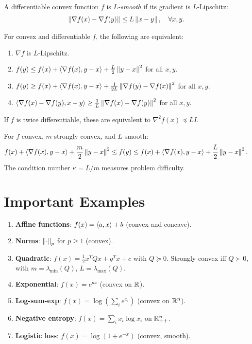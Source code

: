 \begin{definition}[$L$-Smoothness]
A differentiable convex function $f$ is \emph{$L$-smooth} if its gradient is
$L$-Lipschitz:
\[
    \left\| \nabla f(x) - \nabla f(y) \right\| \leq L\left\| x - y \right\|, \quad \forall x, y.
\]
\end{definition}

\begin{theorem}
\label{thm:smoothness}
For convex and differentiable $f$, the following are equivalent:
\begin{enumerate}
    \item $\nabla f$ is $L$-Lipschitz.
    \item $f(y) \leq f(x) + \langle \nabla f(x), y-x \rangle + \frac{L}{2}\left\| y-x \right\|^2$ for all $x, y$.
    \item $f(y) \geq f(x) + \langle \nabla f(x), y-x \rangle + \frac{1}{2L}\left\| \nabla f(y) - \nabla f(x) \right\|^2$ for all $x, y$.
    \item $\langle \nabla f(x) - \nabla f(y), x - y \rangle \geq \frac{1}{L}\left\| \nabla f(x) - \nabla f(y) \right\|^2$ for all $x, y$.
\end{enumerate}
If $f$ is twice differentiable, these are equivalent to $\nabla^2 f(x) \preceq LI$.
\end{theorem}

\begin{keyformulas}[title=\textbf{Fundamental Sandwich Bound}]
For $f$ convex, $m$-strongly convex, and $L$-smooth:
\[
    f(x) + \langle \nabla f(x), y-x \rangle + \frac{m}{2}\left\| y-x \right\|^2
    \leq f(y) \leq
    f(x) + \langle \nabla f(x), y-x \rangle + \frac{L}{2}\left\| y-x \right\|^2.
\]
The condition number $\kappa = L/m$ measures problem difficulty.
\end{keyformulas}

\section{Important Examples}

\begin{example}
\begin{enumerate}
    \item \textbf{Affine functions}: $f(x) = \langle a, x \rangle + b$ (convex and concave).
    \item \textbf{Norms}: $\left\| \cdot \right\|_p$ for $p \geq 1$ (convex).
    \item \textbf{Quadratic}: $f(x) = \frac{1}{2}x^TQx + q^Tx + c$ with $Q \succeq 0$.
          Strongly convex iff $Q \succ 0$, with $m = \lambda_{\min}(Q)$, $L = \lambda_{\max}(Q)$.
    \item \textbf{Exponential}: $f(x) = e^{ax}$ (convex on $\mathbb{R}$).
    \item \textbf{Log-sum-exp}: $f(x) = \log(\sum_i e^{x_i})$ (convex on $\mathbb{R}^n$).
    \item \textbf{Negative entropy}: $f(x) = \sum_i x_i \log x_i$ on $\mathbb{R}^n_{++}$.
    \item \textbf{Logistic loss}: $f(x) = \log(1 + e^{-x})$ (convex, smooth).
\end{enumerate}
\end{example}

